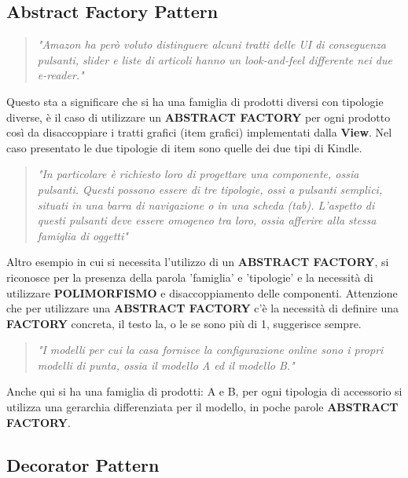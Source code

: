 \documentclass[a4paper,11pt]{article}
\begin{document}
\newpage
	\subsection{Abstract Factory Pattern}
	\begin{quote}
		\textit{"Amazon ha però voluto distinguere alcuni tratti delle UI di conseguenza pulsanti, slider e liste di articoli hanno un look-and-feel differente nei due e-reader."}
	\end{quote}
	
	Questo sta a significare che si ha una famiglia di prodotti diversi con tipologie diverse, è il caso di utilizzare un \textbf{ABSTRACT FACTORY} per ogni prodotto così da disaccoppiare i tratti grafici (item grafici) implementati dalla\textbf{ View}. Nel caso presentato le due tipologie di item sono quelle dei due tipi di Kindle.
	
	\begin{quote}
		\textit{"In particolare è richiesto loro di progettare una componente, ossia pulsanti. Questi possono essere di tre tipologie, ossi a pulsanti semplici, situati in una barra di navigazione o in una scheda (tab). L'aspetto di questi pulsanti deve essere omogeneo tra loro, ossia afferire alla stessa famiglia di oggetti"}
	\end{quote}
	
	Altro esempio in cui si necessita l'utilizzo di un \textbf{ABSTRACT FACTORY}, si riconosce per la presenza della parola 'famiglia' e 'tipologie' e la necessità di utilizzare \textbf{POLIMORFISMO} e disaccoppiamento delle componenti. Attenzione che per utilizzare una \textbf{ABSTRACT FACTORY} c'è la necessità di definire una \textbf{FACTORY} concreta, il testo la, o le se sono più di 1, suggerisce sempre.
	
	\begin{quote}
		\textit{"I modelli per cui la casa fornisce la configurazione online sono i propri modelli di punta, ossia il modello A ed il modello B."}
	\end{quote}
	
	Anche qui si ha una famiglia di prodotti: A e B, per ogni tipologia di accessorio si utilizza una gerarchia differenziata per il modello, in poche parole \textbf{ABSTRACT FACTORY}. 
	
	

\newpage	
	\subsection{Decorator Pattern}
	
\end{document}

